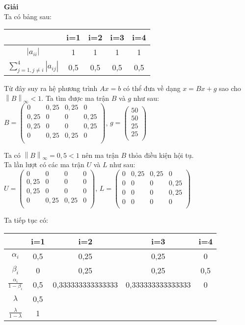 \textbf{Giải}\\
Ta có bảng sau:
\begin{center}\begin{tabular}{|c|c|c|c|c|}\hline
&i=1&i=2&i=3&i=4\\\hline
$\left|a_{ii}\right|$&1&1&1&1\\\hline
$\sum\limits_{j=1,j\neq i}^{4} \left|a_{ij}\right|$&0,5&0,5&0,5&0,5\\\hline
\end{tabular}\end{center}

Từ đây suy ra hệ phương trình $Ax=b$ có thể đưa về dạng $x=Bx+g$ sao cho $\left\|B\right\|_{\infty} <1$.
Ta tìm được ma trận $B$ và $g$ như sau:\\
$B=\begin{pmatrix}
0&0,25&0,25&0\\
0,25&0&0&0,25\\
0,25&0&0&0,25\\
0&0,25&0,25&0\\
\end{pmatrix}$, $g=\begin{pmatrix}
50\\
50\\
25\\
25\\
\end{pmatrix}$

Ta có $\left\|B\right\|_{\infty}= 0,5<1$ nên ma trận $B$ thỏa điều kiện hội tụ.\\
Ta lần lượt có các ma trận $U$ và $L$ như sau:\\
$U=\begin{pmatrix}
0&0&0&0\\
0,25&0&0&0\\
0,25&0&0&0\\
0&0,25&0,25&0\\
\end{pmatrix}$, $L=\begin{pmatrix}
0&0,25&0,25&0\\
0&0&0&0,25\\
0&0&0&0,25\\
0&0&0&0\\
\end{pmatrix}$

Ta tiếp tục có:
\begin{center}\begin{tabular}{|c|c|c|c|c|}\hline
&i=1&i=2&i=3&i=4\\\hline
$\alpha_i$&0,5&0,25&0,25&0\\\hline
$\beta_i$&0&0,25&0,25&0,5\\\hline
$\frac{\alpha_i}{1-\beta_i}$&0,5&0,333333333333333&0,333333333333333&0\\\hline
$\lambda$&0,5&&&\\\hline
$\frac{\lambda}{1-\lambda}$&1&&&\\\hline
\end{tabular}\end{center}

